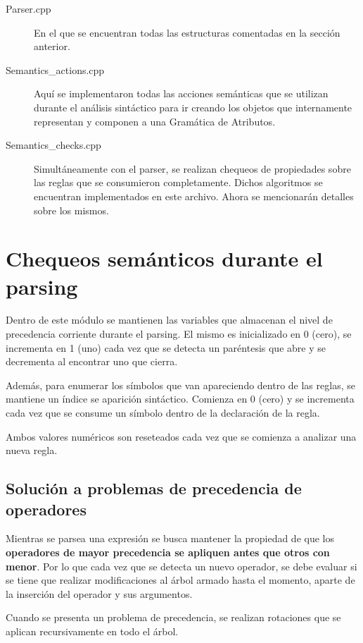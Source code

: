\begin{description}
\item [Parser.cpp] En el que se encuentran todas las estructuras comentadas en la sección anterior.

\item [Semantics\_actions.cpp] Aquí se implementaron todas las acciones semánticas que se utilizan durante el análisis sintáctico para ir creando los objetos que internamente representan y componen a una Gramática de Atributos.

\item [Semantics\_checks.cpp] Simultáneamente con el parser, se realizan chequeos de propiedades sobre las reglas que se consumieron completamente. Dichos algoritmos se encuentran implementados en este archivo. Ahora se mencionarán detalles sobre los mismos.
\end{description}

\section{Chequeos semánticos durante el parsing}
\label{sec:checksem}

Dentro de este módulo se mantienen las variables que almacenan el nivel de precedencia corriente durante el parsing. El mismo es inicializado en 0 (cero), se incrementa en 1 (uno) cada vez que se detecta un paréntesis que abre y se decrementa al encontrar uno que cierra.

Además, para enumerar los símbolos que van apareciendo dentro de las reglas, se mantiene un índice se aparición sintáctico. Comienza en 0 (cero) y se incrementa cada vez que se consume un símbolo dentro de la declaración de la regla.

Ambos valores numéricos son reseteados cada vez que se comienza a analizar una nueva regla.

\subsection{Solución a problemas de precedencia de operadores}

Mientras se parsea una expresión se busca mantener la propiedad de que los \textbf{operadores de mayor precedencia se apliquen antes que otros con menor}. Por lo que cada vez que se detecta un nuevo operador, se debe evaluar si se tiene que realizar modificaciones al árbol armado hasta el momento, aparte de la inserción del operador y sus argumentos.

Cuando se presenta un problema de precedencia, se realizan rotaciones que se aplican recursivamente en todo el árbol. 

